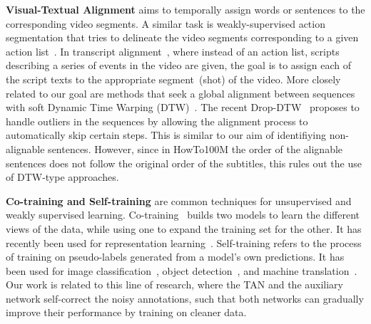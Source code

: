 \par{\noindent \textbf{Visual-Textual Alignment}}
aims to temporally assign words or sentences to the corresponding
video segments.  A similar task is weakly-supervised action
segmentation that tries to delineate the video segments corresponding
to a given action
list~\cite{Bojanowski14,Bojanowski15,Kuehne17,Ding18,Huang16,Richard18,Chang19,Zhukov2019,Li19cdfl,Zhang21tqn}.
In transcript
alignment~\cite{Sankar06,Cour08,Sankar09,Zhu15,Tapaswi15}, where
instead of an action list, scripts describing a series of events in
the video are given, the goal is to assign each of the script texts to
the appropriate segment~(shot) of the video.  More closely related to
our goal are methods that seek a global alignment between sequences
with soft Dynamic Time Warping (DTW)~\cite{Cuturi17}. The recent
Drop-DTW~\cite{Dvornik21} proposes to handle outliers in the sequences
by allowing the alignment process to automatically skip certain
steps. This is similar to our aim of identifiying non-alignable
sentences. However, since in HowTo100M the order of the alignable sentences 
does not follow the original order of 
the subtitles, this rules out the use of DTW-type approaches.\\[-8pt]

\par{\noindent \textbf{Co-training and Self-training}}
are common techniques for unsupervised and weakly supervised learning.
Co-training~\cite{Blum98} builds two models 
to learn the different views of the data, 
while using one to expand the training set for the other.
It has recently been used for representation learning~\cite{Tian20,Han20coclr}.
Self-training refers to the process of training on 
pseudo-labels generated from a model's own predictions.
It has been used for image classification~\cite{Caron18,Xie20_student,Caron20,Asano20}, 
object detection~\cite{Cinbis15}, and machine translation~\cite{He20}. 
Our work is related to this line of research, 
where the TAN and the auxiliary network self-correct the noisy annotations, 
such that both networks can gradually improve their performance by training on cleaner data. \\[-8pt]

